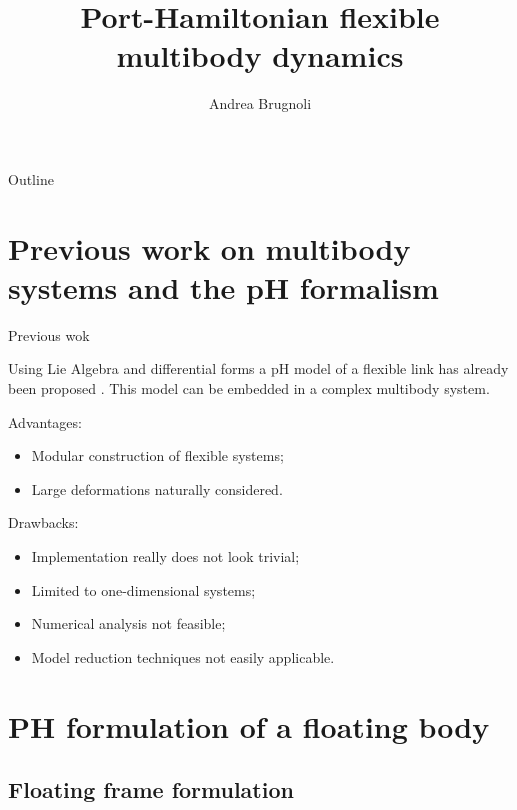 \documentclass[aspectratio=169]{ISAE-Beamer}
\title[Virtual INFIDHEM meeting]{Port-Hamiltonian flexible multibody dynamics}
\institute[ISAE]
{\inst{1}ISAE-SUPAERO, Toulouse}
\author[Andrea Brugnoli]{Andrea Brugnoli}
\begin{document}
\maketitle

\begin{frame}{Outline}

\tableofcontents

\end{frame}

\section{Previous work on multibody systems and the pH formalism}

\begin{frame}{Previous wok}

Using Lie Algebra and differential forms a pH model of a flexible link has already been proposed . This model can be embedded in a complex multibody system. \\
\begin{overlayarea}{\textwidth}{0.55\textheight}
	\setlength{\abovedisplayskip}{1pt}
	\setlength{\belowdisplayskip}{1pt}
Advantages:
\begin{itemize}
	\item {Modular construction of flexible systems;}
	\item {Large deformations naturally considered.}
\end{itemize}
Drawbacks:
\begin{itemize}
	\item {Implementation really does not look trivial;}
	\item {Limited to one-dimensional systems;}
	\item {Numerical analysis not feasible;}
	\item {Model reduction techniques not easily applicable.} 
\end{itemize}
\end{overlayarea}
\end{frame}

\section{PH formulation of a floating body}

\subsection{Floating frame formulation}
\end{document}
